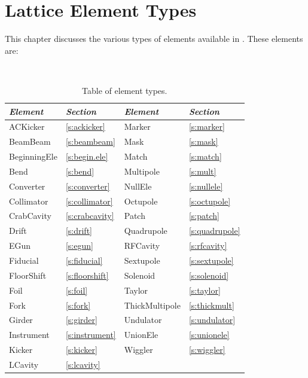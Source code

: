 \chapter{Lattice Element Types}
\label{c:ele.types}


This chapter discusses the various types of elements
available in \accellat.
These elements are:
\begin{table}[htb]
\centering
{\tt
\begin{tabular}{llll} \toprule
  {\it Element}     & {\it Section}         & {\it Element}      & {\it Section}      \\ \midrule
  ACKicker          & \ref{s:ackicker}      &  Marker           & \ref{s:marker}      \\
  BeamBeam          & \ref{s:beambeam}      &  Mask             & \ref{s:mask}        \\
  BeginningEle      & \ref{s:begin.ele}     &  Match            & \ref{s:match}       \\
  Bend              & \ref{s:bend}          &  Multipole        & \ref{s:mult}        \\
  Converter         & \ref{s:converter}     &  NullEle          & \ref{s:nullele}     \\
  Collimator        & \ref{s:collimator}    &  Octupole         & \ref{s:octupole}    \\
  CrabCavity        & \ref{s:crabcavity}    &  Patch            & \ref{s:patch}       \\
  Drift             & \ref{s:drift}         &  Quadrupole       & \ref{s:quadrupole}  \\
  EGun              & \ref{s:egun}          &  RFCavity         & \ref{s:rfcavity}    \\
  Fiducial          & \ref{s:fiducial}      &  Sextupole        & \ref{s:sextupole}   \\
  FloorShift        & \ref{s:floorshift}    &  Solenoid         & \ref{s:solenoid}    \\
  Foil              & \ref{s:foil}          &  Taylor           & \ref{s:taylor}      \\
  Fork              & \ref{s:fork}          &  ThickMultipole   & \ref{s:thickmult}   \\
  Girder            & \ref{s:girder}        &  Undulator        & \ref{s:undulator}   \\
  Instrument        & \ref{s:instrument}    &  UnionEle         & \ref{s:unionele}    \\
  Kicker            & \ref{s:kicker}        &  Wiggler          & \ref{s:wiggler}     \\
  LCavity           & \ref{s:lcavity}       &                   &                     \\
  \bottomrule
\end{tabular}
} 
\caption{Table of element types.}
\label{t:particle.classes}
\end{table}

